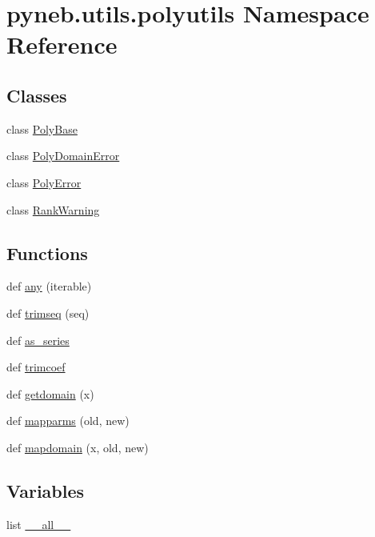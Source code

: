 \hypertarget{namespacepyneb_1_1utils_1_1polyutils}{}\section{pyneb.\+utils.\+polyutils Namespace Reference}
\label{namespacepyneb_1_1utils_1_1polyutils}
\subsection*{Classes}
\begin{DoxyCompactItemize}
\item 
class \hyperlink{classpyneb_1_1utils_1_1polyutils_1_1_poly_base}{Poly\+Base}
\item 
class \hyperlink{classpyneb_1_1utils_1_1polyutils_1_1_poly_domain_error}{Poly\+Domain\+Error}
\item 
class \hyperlink{classpyneb_1_1utils_1_1polyutils_1_1_poly_error}{Poly\+Error}
\item 
class \hyperlink{classpyneb_1_1utils_1_1polyutils_1_1_rank_warning}{Rank\+Warning}
\end{DoxyCompactItemize}
\subsection*{Functions}
\begin{DoxyCompactItemize}
\item 
def \hyperlink{namespacepyneb_1_1utils_1_1polyutils_a7a16ae5631115dce0a513eaec3a06470}{any} (iterable)
\item 
def \hyperlink{namespacepyneb_1_1utils_1_1polyutils_a2d09c123dbbcfd4623784cacf1fc945c}{trimseq} (seq)
\item 
def \hyperlink{namespacepyneb_1_1utils_1_1polyutils_a9c3751d438f0f75922155c7823fe2699}{as\+\_\+series}
\item 
def \hyperlink{namespacepyneb_1_1utils_1_1polyutils_a505e3038cfd08b7f444ecca2234daa46}{trimcoef}
\item 
def \hyperlink{namespacepyneb_1_1utils_1_1polyutils_a3216f3b76273619e84e2e0e6c22dbf21}{getdomain} (x)
\item 
def \hyperlink{namespacepyneb_1_1utils_1_1polyutils_a3621b172891db0806163f72f22e3723b}{mapparms} (old, new)
\item 
def \hyperlink{namespacepyneb_1_1utils_1_1polyutils_a9a4c51bf58904c4c9ddc7d7525404481}{mapdomain} (x, old, new)
\end{DoxyCompactItemize}
\subsection*{Variables}
\begin{DoxyCompactItemize}
\item 
list \hyperlink{namespacepyneb_1_1utils_1_1polyutils_a5e54a45bb5c6fa4444f663a0b0da0e1f}{\+\_\+\+\_\+all\+\_\+\+\_\+}
\end{DoxyCompactItemize}


